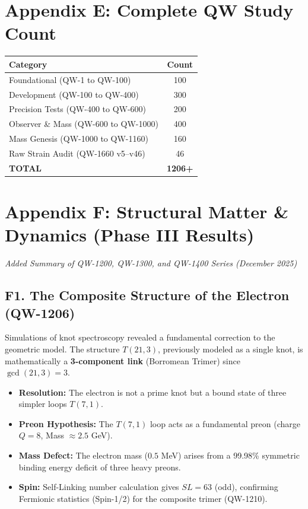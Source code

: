 \documentclass[11pt,a4paper]{book}
\theoremstyle{remark}
\begin{document}
\section{Appendix E: Complete QW Study Count}

\begin{center}
\begin{tabular}{|l|c|}
\hline
\textbf{Category} & \textbf{Count} \\
\hline
Foundational (QW-1 to QW-100) & 100 \\
Development (QW-100 to QW-400) & 300 \\
Precision Tests (QW-400 to QW-600) & 200 \\
Observer \& Mass (QW-600 to QW-1000) & 400 \\
Mass Genesis (QW-1000 to QW-1160) & 160 \\
Raw Strain Audit (QW-1660 v5--v46) & 46 \\
\hline
\textbf{TOTAL} & \textbf{1206+} \\
\hline
\end{tabular}
\end{center}

\section{Appendix F: Structural Matter \& Dynamics (Phase III Results)}

\textit{Added Summary of QW-1200, QW-1300, and QW-1400 Series (December 2025)}

\subsection{F1. The Composite Structure of the Electron (QW-1206)}
Simulations of knot spectroscopy revealed a fundamental correction to the geometric model. The structure $T(21,3)$, previously modeled as a single knot, is mathematically a \textbf{3-component link} (Borromean Trimer) since $\gcd(21,3)=3$.
\begin{itemize}
    \item \textbf{Resolution:} The electron is not a prime knot but a bound state of three simpler loops $T(7,1)$.
    \item \textbf{Preon Hypothesis:} The $T(7,1)$ loop acts as a fundamental preon (charge $Q=8$, Mass $\approx 2.5$ GeV).
    \item \textbf{Mass Defect:} The electron mass ($0.5$ MeV) arises from a 99.98\% symmetric binding energy deficit of three heavy preons.
    \item \textbf{Spin:} Self-Linking number calculation gives $SL=63$ (odd), confirming Fermionic statistics (Spin-1/2) for the composite trimer (QW-1210).
\end{itemize}
\end{document}
